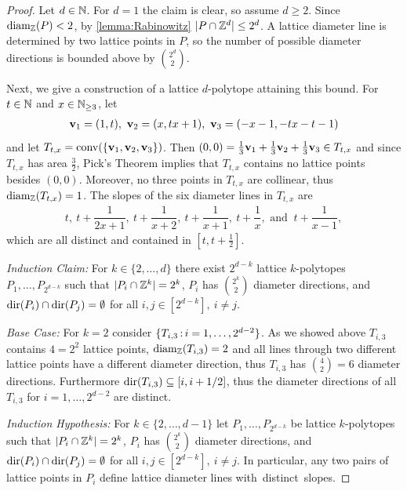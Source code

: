 \begin{proof}
Let $d \in \mathbb{N}$. For $d=1$ the claim is clear, so assume $d \geq 2$. Since $\operatorname{diam_{\mathbb{Z}}}(P)<2$, by \ref{lemma:Rabinowitz} $|P \cap \mathbb{Z}^d| \leq 2^d$. A lattice diameter line is determined by two lattice points in $P$, so the number of possible diameter directions is bounded above by $\binom{2^d}{2}$.

Next, we give a construction of a lattice $d$-polytope attaining this bound. For $t \in \mathbb{N}$ and $x \in \mathbb{N}_{\geq 3}$, let\vspace{-5pt}
    \begin{align*}
        \mathbf{v}_1=(1,t), \ \mathbf{v}_2=(x, tx+1), \ \mathbf{v}_3=(-x-1, -tx-t-1)
    \end{align*}
    and let $T_{t,x} = \operatorname{conv} (\{\mathbf{v}_1,\mathbf{v}_2,\mathbf{v}_3\})$.
    Then $(0,0) = \frac{1}{3}\mathbf{v}_1+ \frac{1}{3}\mathbf{v}_2+ \frac{1}{3}\mathbf{v}_3 \in T_{t,x}$ and since  $T_{t,x}$ has area $\frac{3}{2}$, Pick's Theorem \cite{pick99} implies that $T_{t,x}$ contains no lattice points besides $(0,0)$. Moreover, no three points in $T_{t,x}$ are collinear, thus $\operatorname{diam_{\mathbb{Z}}}(T_{t,x})=1$. The slopes of the six diameter lines in $T_{t,x}$ are
    \begin{align*}
    t, \ t + \dfrac{1}{2x + 1}, \ t + \dfrac{1}{x + 2}, \ t + \dfrac{1}{x + 1}, \ t + \dfrac{1}{x}, \text{ and }\ t + \dfrac{1}{x - 1},
    \end{align*}
    which are all distinct and contained in $[t,t+\frac{1}{2}]$.

    \emph{Induction Claim:} For $k \in \{2, \ldots, d\}$ there exist $2^{d-k}$ lattice $k$-polytopes $P_1, \ldots, P_{2^{d-k}}$ such that $|P_i \cap \mathbb{Z}^k| = 2^k$, $P_i$ has $\binom{2^k}{2}$ diameter directions, and $\operatorname{dir}(P_i) \cap \operatorname{dir}(P_j)  = \emptyset$ for all $i,j \in [2^{d-k}], \ i \neq j$.
    
    \emph{Base Case:} For $k=2$ consider $\{ T_{i,3} \, \mathrm{:}\, i=1, \ldots, 2^{d-2} \}$. As we showed above $T_{i,3}$ contains $4=2^2$ lattice points, $\operatorname{diam_{\mathbb{Z}}}(T_{i,3})=2$ and all lines through two different lattice points have a different diameter direction, thus $T_{i,3}$ has $\binom{4}{2}=6$ diameter directions. Furthermore $\operatorname{dir}(T_{i,3}) \subseteq [i,i+1/2]$, thus the diameter directions of all $T_{i,3}$ for $i =1, \ldots, 2^{d-2}$  are distinct. 

    \emph{Induction Hypothesis:} For $k \in \{2, \ldots, d-1\}$ let $P_1, \ldots, P_{2^{d-k}}$ be lattice $k$-polytopes such that $|P_i \cap \mathbb{Z}^k| = 2^k$, $P_i$ has $\binom{2^k}{2}$ diameter directions, and $\operatorname{dir}(P_i) \cap \operatorname{dir}(P_j)  = \emptyset$ for all $i,j \in [2^{d-k}], \ i \neq j$. In particular, any two pairs of lattice points in $P_i$ define lattice diameter lines \mbox{with distinct slopes.}


\end{proof}
